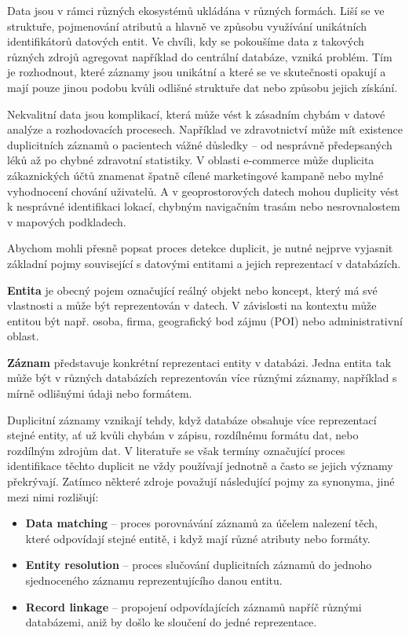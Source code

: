 Data jsou v rámci různých ekosystémů ukládána v různých formách. Liší se ve struktuře, pojmenování atributů a hlavně ve způsobu využívání unikátních identifikátorů datových entit. Ve chvíli, kdy se pokoušíme data z takových různých zdrojů agregovat například do centrální databáze, vzniká problém. Tím je rozhodnout, které záznamy jsou unikátní a které se ve skutečnosti opakují a mají pouze jinou podobu kvůli odlišné struktuře dat nebo způsobu jejich získání.

Nekvalitní data jsou komplikací, která může vést k zásadním chybám v datové analýze a rozhodovacích procesech. Například ve zdravotnictví může mít existence duplicitních záznamů o pacientech vážné důsledky – od nesprávně předepsaných léků až po chybné zdravotní statistiky.\cite{bess_problem_2024} V oblasti e-commerce může duplicita zákaznických účtů znamenat špatně cílené marketingové kampaně nebo mylné vyhodnocení chování uživatelů.\cite{brown_8_2019} A v geoprostorových datech mohou duplicity vést k nesprávné identifikaci lokací, chybným navigačním trasám nebo nesrovnalostem v mapových podkladech.

Abychom mohli přesně popsat proces detekce duplicit, je nutné nejprve vyjasnit základní pojmy související s datovými entitami a jejich reprezentací v databázích.

\textbf{Entita} je obecný pojem označující reálný objekt nebo koncept, který má své vlastnosti a může být reprezentován v datech. V závislosti na kontextu může entitou být např. osoba, firma, geografický bod zájmu (POI) nebo administrativní oblast.

\textbf{Záznam} představuje konkrétní reprezentaci entity v databázi. Jedna entita tak může být v různých databázích reprezentován více různými záznamy, například s mírně odlišnými údaji nebo formátem.

Duplicitní záznamy vznikají tehdy, když databáze obsahuje více reprezentací stejné entity, ať už kvůli chybám v zápisu, rozdílnému formátu dat, nebo rozdílným zdrojům dat. V literatuře se však termíny označující proces identifikace těchto duplicit ne vždy používají jednotně a často se jejich významy překrývají. Zatímco některé zdroje považují následující pojmy za synonyma, jiné mezi nimi rozlišují:

\begin{itemize}
  \item \textbf{Data matching} – proces porovnávání záznamů za účelem nalezení těch, které odpovídají stejné entitě, i když mají různé atributy nebo formáty. \cite{christen_data_2012}
  \item \textbf{Entity resolution} – proces slučování duplicitních záznamů do jednoho sjednoceného záznamu reprezentujícího danou entitu. \cite{quantexa_what_2024}
  \item \textbf{Record linkage} – propojení odpovídajících záznamů napříč různými databázemi, aniž by došlo ke sloučení do jedné reprezentace. \cite{stepanenko_what_2024}
\end{itemize}

